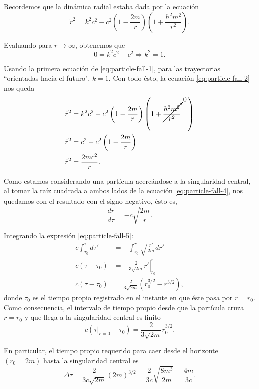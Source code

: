 \documentclass[letterpaper,11pt]{article}
\begin{document}
Recordemos que la dinámica radial estaba dada por la ecuación
\begin{equation}
\dot{r}^2 = k^2c^2 - c^2 \left(1 - \frac{2m}{r} \right)\left( 1 + \frac{h^2m^2}{r^2}\right). \label{eq:particle-fall-2}
\end{equation}

Evaluando para $r \to \infty$, obtenemos que
\begin{equation}
0 = k^2c^2 - c^2 \Rightarrow k^2 = 1. \label{eq:particle-fall-3}
\end{equation}

Usando la primera ecuación de \eqref{eq:particle-fall-1}, para las trayectorias ``orientadas hacia el futuro", $k = 1$. Con todo ésto, la ecuación \eqref{eq:particle-fall-2} nos queda
\begin{align}
\dot{r}^2 &= k^2c^2 - c^2 \left(1 - \frac{2m}{r} \right)\left( 1 + \cancelto{0}{\frac{h^2m^2}{r^2}}\quad \right) \\
\dot{r}^2 &= c^2 - c^2\left(1 - \frac{2m}{r} \right) \\
\dot{r}^2 &= \frac{2mc^2}{r}. \label{eq:particle-fall-4}
\end{align}

Como estamos considerando una partícula acercándose a la singularidad central, al tomar la raíz cuadrada a ambos lados de la ecuación \eqref{eq:particle-fall-4}, nos quedamos con el resultado con el signo negativo, ésto es,
\begin{equation}
\frac{dr}{d\tau} = - c \sqrt{\frac{2m}{r}}. \label{eq:particle-fall-5}
\end{equation}

Integrando la expresión \eqref{eq:particle-fall-5}:
\begin{align}
c \int_{\tau_0}^{\tau} d\tau' &= - \int_{r_0}^{r} \sqrt{\frac{r'}{2m}} dr' \\
c (\tau - \tau_0) &=  \left. - \frac{2}{3\sqrt{2m}} r' \right|_{r_0}^{r} \\
c (\tau - \tau_0) &=  \frac{2}{3\sqrt{2m}} \left( r_0^{3/2} - r^{3/2}\right),
\end{align}
donde $\tau_0$ es el tiempo propio registrado en el instante en que éste pasa por $r = r_0$. Como consecuencia, el intervalo de tiempo propio desde que la partícula cruza $r =r_0$ y que llega a la singularidad central es finito
\begin{equation}
c(\tau|_{r = 0} - \tau_0) = \frac{2}{3\sqrt{2m}} r_0^{3/2}.
\end{equation}

En particular, el tiempo propio requerido para caer desde el horizonte $(r_0 = 2m)$ hasta la singularidad central es
\begin{equation}
\Delta \tau = \frac{2}{3c \sqrt{2m}} (2m)^{3/2} = \frac{2}{3c} \sqrt{\frac{8m^3}{2m}} = \frac{4m}{3c}.
\end{equation}
\end{document}
